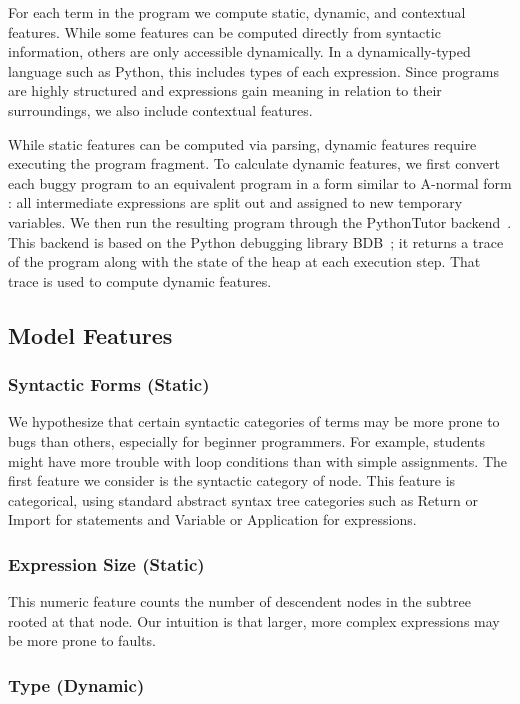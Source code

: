 \documentclass[conference]{IEEEtran}
\begin{document}
For each term in the program we compute static, dynamic, and contextual
features. While some features can be computed directly from syntactic
information, others are only accessible dynamically. In a
dynamically-typed language such as Python, this includes types of each
expression. Since programs are highly structured and expressions gain
meaning in relation to their surroundings, we also include contextual
features.

While static features can be computed via parsing, dynamic features require
executing the program fragment. To calculate dynamic features, we first
convert each buggy program to an equivalent program in a form similar to
A-normal form \cite{anf}: all intermediate expressions are split out and
assigned to new temporary variables.
We then run the resulting program through the PythonTutor
backend~\cite{Guo2013-vu}.  This backend is based on the Python debugging
library BDB~\cite{FIXME}; it returns a trace of the program along with the
state of the heap at each execution step. That trace is used to compute
dynamic features.

\subsection{Model Features}
\label{sec-features}

\subsubsection{Syntactic Forms (Static)}

We hypothesize that certain syntactic categories of terms may be more
prone to bugs than others, especially for beginner programmers.  For
example, students might have more trouble with loop conditions than with
simple assignments. The first feature we consider is the syntactic
category of node. This feature is categorical, using standard abstract
syntax tree categories such as Return or Import for statements and Variable
or Application for expressions.

\subsubsection{Expression Size (Static)}

This numeric feature counts the number of descendent nodes in the subtree
rooted at that node. Our intuition is that larger, more complex expressions
may be more prone to faults.

\subsubsection{Type (Dynamic)}
\end{document}
